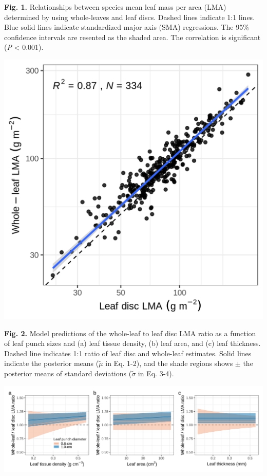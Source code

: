 \documentclass[
  12pt,
  a4paper,
,tablecaptionabove
]{scrartcl}
\begin{document}
\newpage

\textbf{Fig. 1.}
Relationships between species mean leaf mass per area (LMA) determined by using whole-leaves and leaf discs.
Dashed lines indicate 1:1 lines.
Blue solid lines indicate standardized major axis (SMA) regressions.
The 95\% confidence intervals are resented as the shaded area.
The correlation is significant (\emph{P} \textless{} 0.001).

\includegraphics{../figs/sma.png}

\newpage

\textbf{Fig. 2.}
Model predictions of the whole-leaf to leaf disc LMA ratio as a function of leaf punch sizes and (a) leaf tissue density, (b) leaf area, and (c) leaf thickness.
Dashed line indicates 1:1 ratio of leaf disc and whole-leaf estimates.
Solid lines indicate the posterior means (\(\tilde{\mu}\) in Eq. 1-2), and the shade regions shows \(\pm\) the posterior means of standard deviations (\(\tilde{\sigma}\) in Eq. 3-4).

\includegraphics{../figs/pred_mcmc.png}
\end{document}
